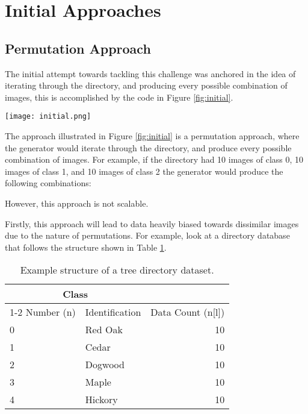 \documentclass[
	letterpaper, %
	10pt, %
	unnumberedsections, %
	twoside, %
]{LTJournalArticle}
\begin{document}
\section{Initial Approaches}

\subsection{Permutation Approach}
The initial attempt towards tackling this challenge was anchored in the idea of iterating through the directory, and producing every possible combination of images, this is accomplished by the code in Figure \ref{fig:initial}.

\begin{figure*} %
	\texttt{[image: initial.png]}
	\caption{The initial Python code for developing a generator for Siamese Neural Networks.}
	\label{fig:initial}
\end{figure*}

The approach illustrated in Figure \ref{fig:initial} is a permutation approach, where the generator would iterate through the directory, and produce every possible combination of images. For example, if the directory had 10 images of class 0, 10 images of class 1, and 10 images of class 2 the generator would produce the following combinations:


However, this approach is not scalable. %

Firstly, this approach will lead to data heavily biased towards dissimilar images due to the nature of permutations. For example, look at a directory database that follows the structure shown in Table \ref{tab:structure}.

\begin{table}[h!] %
	\caption{Example structure of a tree directory dataset.}
	\centering
	\begin{tabular}{l l r}
		\toprule
		\multicolumn{2}{c}{Class} \\
		\cmidrule(r){1-2}
		Number (n) & Identification & Data Count (n[l]) \\
		\midrule
		0 & Red Oak & 10 \\
		1 & Cedar & 10 \\
		2 & Dogwood & 10 \\
		3 & Maple & 10 \\
		4 & Hickory & 10 \\
		\bottomrule
	\end{tabular}
	\label{tab:structure}
\end{table}
\end{document}

